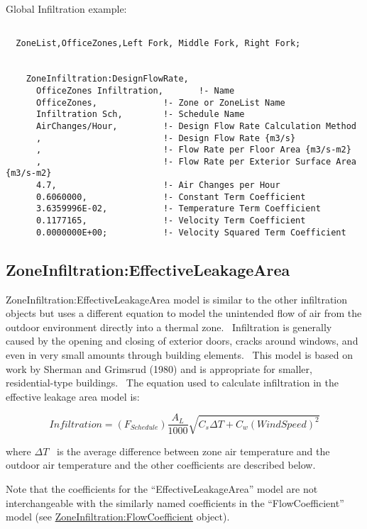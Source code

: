 Global Infiltration example:

\begin{lstlisting}

  ZoneList,OfficeZones,Left Fork, Middle Fork, Right Fork;


    ZoneInfiltration:DesignFlowRate,
      OfficeZones Infiltration,       !- Name
      OfficeZones,             !- Zone or ZoneList Name
      Infiltration Sch,        !- Schedule Name
      AirChanges/Hour,         !- Design Flow Rate Calculation Method
      ,                        !- Design Flow Rate {m3/s}
      ,                        !- Flow Rate per Floor Area {m3/s-m2}
      ,                        !- Flow Rate per Exterior Surface Area {m3/s-m2}
      4.7,                     !- Air Changes per Hour
      0.6060000,               !- Constant Term Coefficient
      3.6359996E-02,           !- Temperature Term Coefficient
      0.1177165,               !- Velocity Term Coefficient
      0.0000000E+00;           !- Velocity Squared Term Coefficient
\end{lstlisting}

\subsection{ZoneInfiltration:EffectiveLeakageArea}\label{zoneinfiltrationeffectiveleakagearea}

ZoneInfiltration:EffectiveLeakageArea model is similar to the other infiltration objects but uses a different equation to model the unintended flow of air from the outdoor environment directly into a thermal zone.~ Infiltration is generally caused by the opening and closing of exterior doors, cracks around windows, and even in very small amounts through building elements.~ This model is based on work by Sherman and Grimsrud (1980) and is appropriate for smaller, residential-type buildings.~ The equation used to calculate infiltration in the effective leakage area model is:

\begin{equation}
Infiltration = \left( {{F_{Schedule}}} \right)\frac{{{A_L}}}{{1000}}\sqrt {{C_s}\Delta T + {C_w}{{\left( {WindSpeed} \right)}^2}}
\end{equation}

where \(\Delta T\) ~is the average difference between zone air temperature and the outdoor air temperature and the other coefficients are described below.

Note that the coefficients for the ``EffectiveLeakageArea'' model are not interchangeable with the similarly named coefficients in the ``FlowCoefficient'' model (see \hyperref[zoneinfiltrationflowcoefficient]{ZoneInfiltration:FlowCoefficient} object).


